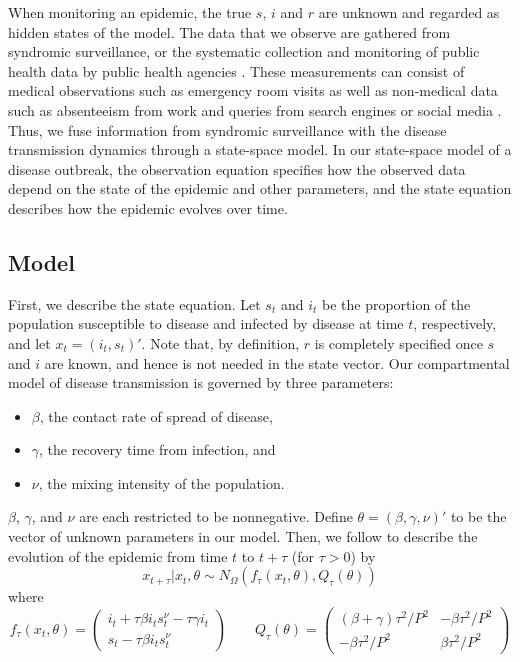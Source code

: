 \documentclass{elsarticle}
\begin{document}
When monitoring an epidemic, the true $s$, $i$ and $r$ are unknown and regarded as hidden states of the model. The data that we observe are gathered from syndromic surveillance, or the systematic collection and monitoring of public health data by public health agencies \citep{wagner2006biosurveillance, wilson2006synsurveillance}. These measurements can consist of medical observations such as emergency room visits as well as non-medical data such as absenteeism from work and queries from search engines or social media \citep{chew2010twitter, schuster2010searchquery, signorini2011twitter, Gins:Mohe:Pate:Bram:Smol:Bril:dete:2009}. Thus, we fuse information from syndromic surveillance with the disease transmission dynamics through a state-space model. In our state-space model of a disease outbreak, the observation equation specifies how the observed data depend on the state of the epidemic and other parameters, and the state equation describes how the epidemic evolves over time.

\subsection{Model \label{sec:model}}

First, we describe the state equation. Let $s_t$ and $i_t$ be the proportion of the population susceptible to disease and infected by disease at time $t$, respectively, and let $x_t = (i_t,s_t)'$. Note that, by definition, $r$ is completely specified once $s$ and $i$ are known, and hence is not needed in the state vector. Our compartmental model of disease transmission is governed by three parameters:

\begin{itemize}
\item $\beta$, the contact rate of spread of disease,
\item $\gamma$, the recovery time from infection, and
\item $\nu$, the mixing intensity of the population.
\end{itemize}

\noindent $\beta$, $\gamma$, and $\nu$ are each restricted to be nonnegative. Define $\theta = (\beta,\gamma,\nu)'$ to be the vector of unknown parameters in our model. Then, we follow \citet{skvortsov2012monitoring} to describe the evolution of the epidemic from time $t$ to $t + \tau$ (for $\tau > 0$) by
\begin{equation}
x_{t+\tau}\left|x_t,\theta\right. \sim N_\Omega\left(f_\tau(x_t,\theta),Q_{\tau}(\theta)\right) \label{eqn:state}
\end{equation}
\noindent where
\[
f_\tau(x_t,\theta) = \left(
\begin{array}{c}
i_t +  \tau\beta i_ts^\nu_t - \tau\gamma i_t \\
s_t - \tau\beta i_ts^{\nu}_t
\end{array}
\right)
\qquad
Q_\tau(\theta) = \left(
\begin{array}{ccccc}
(\beta + \gamma)\tau^2/P^2 & -\beta\tau^2/P^2 \\
-\beta\tau^2/P^2 & \beta\tau^2/P^2
\end{array}
\right)
\]
\end{document}
